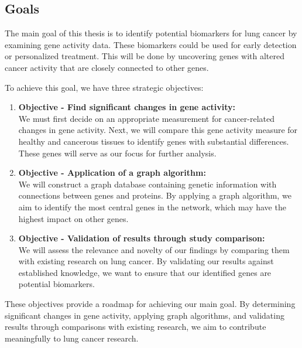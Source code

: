 \subsection{Goals} \label{subsec:goals}
The main goal of this thesis is to identify potential biomarkers for lung cancer by examining gene activity data.
These biomarkers could be used for early detection or personalized treatment.
This will be done by uncovering genes with altered cancer activity that are closely connected to other genes.

To achieve this goal, we have three strategic objectives:
\begin{enumerate}
    \item \textbf{Objective - Find significant changes in gene activity:}\\
    We must first decide on an appropriate measurement for cancer-related changes in gene activity.
    Next, we will compare this gene activity measure for healthy and cancerous tissues to identify genes with substantial differences.
    These genes will serve as our focus for further analysis.
    \label{obj:delta_tpm}

    \item \textbf{Objective - Application of a graph algorithm:}\\
    We will construct a graph database containing genetic information with connections between genes and proteins.
    By applying a graph algorithm, we aim to identify the most central genes in the network,
    which may have the highest impact on other genes.
    \label{obj:graph_algorithm}

    \item \textbf{Objective - Validation of results through study comparison:}\\
    We will assess the relevance and novelty of our findings by comparing them with existing research on lung cancer.
    By validating our results against established knowledge, we want to ensure that our identified genes are potential biomarkers.
    \label{obj:validation}
\end{enumerate}

These objectives provide a roadmap for achieving our main goal.
By determining significant changes in gene activity, applying graph algorithms,
and validating results through comparisons with existing research,
we aim to contribute meaningfully to lung cancer research.
